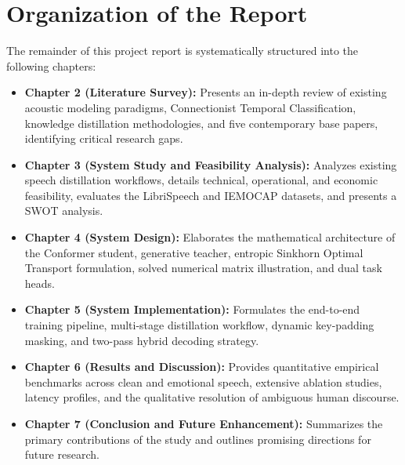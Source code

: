 \section{Organization of the Report}
The remainder of this project report is systematically structured into the following chapters:
\begin{itemize}
    \item \textbf{Chapter 2 (Literature Survey):} Presents an in-depth review of existing acoustic modeling paradigms, Connectionist Temporal Classification, knowledge distillation methodologies, and five contemporary base papers, identifying critical research gaps.
    \item \textbf{Chapter 3 (System Study and Feasibility Analysis):} Analyzes existing speech distillation workflows, details technical, operational, and economic feasibility, evaluates the LibriSpeech and IEMOCAP datasets, and presents a SWOT analysis.
    \item \textbf{Chapter 4 (System Design):} Elaborates the mathematical architecture of the Conformer student, generative teacher, entropic Sinkhorn Optimal Transport formulation, solved numerical matrix illustration, and dual task heads.
    \item \textbf{Chapter 5 (System Implementation):} Formulates the end-to-end training pipeline, multi-stage distillation workflow, dynamic key-padding masking, and two-pass hybrid decoding strategy.
    \item \textbf{Chapter 6 (Results and Discussion):} Provides quantitative empirical benchmarks across clean and emotional speech, extensive ablation studies, latency profiles, and the qualitative resolution of ambiguous human discourse.
    \item \textbf{Chapter 7 (Conclusion and Future Enhancement):} Summarizes the primary contributions of the study and outlines promising directions for future research.
\end{itemize}
